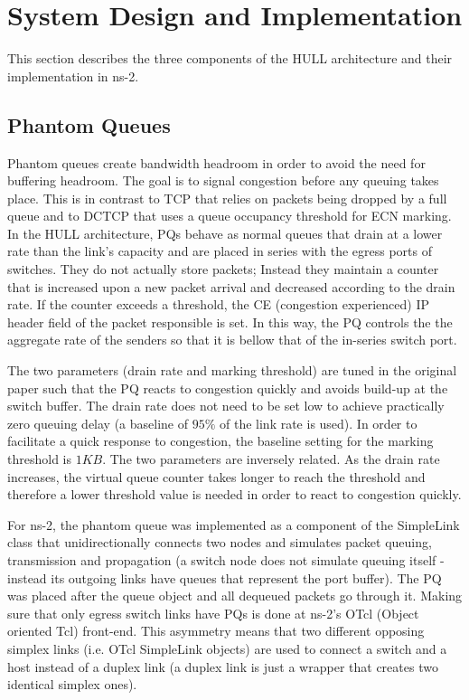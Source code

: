 \documentclass[10pt,conference,compsocconf]{IEEEtran}
\begin{document}
\section{System Design and Implementation}
This section describes the three components of the HULL architecture and their implementation in ns-2.
\subsection{Phantom Queues}
Phantom queues create bandwidth headroom in order to avoid the need for buffering headroom. The goal is to signal congestion before any queuing takes place. This is in contrast to TCP that relies on packets being dropped by a full queue and to DCTCP that uses a queue occupancy threshold for ECN marking. In the HULL architecture, PQs behave as normal queues that drain at a lower rate than the link's capacity and are placed in series with the egress ports of switches. They do not actually store packets; Instead they maintain a counter that is increased upon a new packet arrival and decreased according to the drain rate. If the counter exceeds a threshold, the CE (congestion experienced) IP header field of the packet responsible is set. In this way, the PQ controls the the aggregate rate of the senders so that it is bellow that of the in-series switch port. 

The two parameters (drain rate and marking threshold) are tuned in the original paper \cite{HULL} such that the PQ reacts to congestion quickly and avoids build-up at the switch buffer. The drain rate does not need to be set low to achieve practically zero queuing delay (a baseline of $95\%$ of the link rate is used). In order to facilitate a quick response to congestion, the baseline setting for the marking threshold is $1KB$. The two parameters are inversely related. As the drain rate increases, the virtual queue counter takes longer to reach the threshold and therefore a lower threshold value is needed in order to react to congestion quickly.

For ns-2, the phantom queue was implemented as a component of the SimpleLink class that unidirectionally connects two nodes and simulates packet queuing, transmission and propagation (a switch node does not simulate queuing itself - instead its outgoing links have queues that represent the port buffer). The PQ was placed after the queue object and all dequeued packets go through it. Making sure that only egress switch links have PQs is done at ns-2's OTcl (Object oriented Tcl) \cite{TCL} front-end. This asymmetry means that two different opposing simplex links (i.e. OTcl SimpleLink objects) are used to connect a switch and a host instead of a duplex link (a duplex link is just a wrapper that creates two identical simplex ones).
\end{document}
